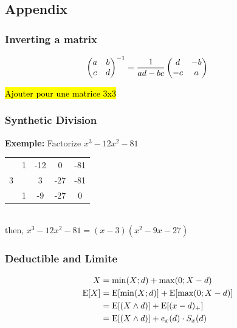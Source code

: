 \documentclass[10pt, french]{article}
\begin{document}
\begin{multicols*}{3}
\part*{Appendix}
\def\SectionColor{black!80!white}
\section*{Inverting a matrix}
\label{Appendix: Inverting a matrix}
\begin{align*}
    \hspace*{-0.9cm}
    \begin{pmatrix}
            a & b \\
            c & d
        \end{pmatrix}^{-1}
    =
    \frac{1}{ad-bc}
    \begin{pmatrix}
            d & -b \\
            -c & a
    \end{pmatrix}
\end{align*}



\hl{Ajouter pour une matrice 3x3}

\section*{Synthetic Division}
\label{Appendix: Synthetic Division}
\textbf{Exemple:} Factorize $x^3 - 12x^2 - 81$\\
\begin{tabular}{c|cccc}
     & 1 & -12 & 0 & -81 \\
   3 &   &   3 & -27& -81 \\
   \hline
     & 1 & -9  & -27  & 0
\end{tabular} \\
then, $x^3 - 12x^2 - 81 = (x-3)(x^2-9x-27)$

\section*{Deductible and Limite}
\begin{align*}
    X &= \min(X;d) + \max(0;X-d) \\
    \mathrm{E} {\left[ X \right]} &= \mathrm{E} {\left[ \min(X;d) \right]} + \mathrm{E} {\left[ \max(0;X-d) \right]} \\
            &= \mathrm{E} {\left[ (X \wedge d) \right]} + \mathrm{E} {\left[ (x-d)_{+} \right]} \\
            &= \mathrm{E} {\left[ (X \wedge d) \right]} + e_x(d)\cdot S_x(d)
\end{align*}


\end{multicols*}
\end{document}
